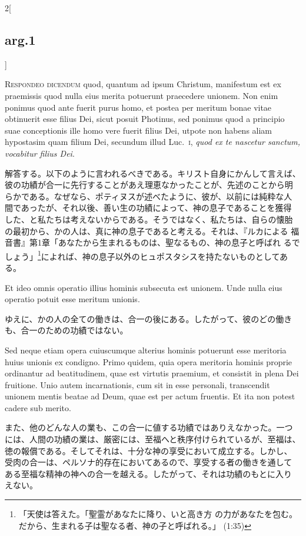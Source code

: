 \documentclass[paper=a4paper,fontsize=10pt,jafontsize=9pt,titlepage]{jlreq}
\begin{document}
\begin{paracol}{2}[\subsection{arg.1}]

{\scshape Respondeo dicendum} quod, quantum ad ipsum Christum,
manifestum est ex praemissis quod nulla eius merita potuerunt
praecedere unionem. Non enim ponimus quod ante fuerit purus homo, et
postea per meritum bonae vitae obtinuerit esse filius Dei, sicut
posuit Photinus, sed ponimus quod a principio suae conceptionis ille
homo vere fuerit filius Dei, utpote non habens aliam hypostasim quam
filium Dei, secundum illud Luc.~{\scshape i}, {\itshape quod ex te
nascetur sanctum, vocabitur filius Dei}.

\switchcolumn

解答する。以下のように言われるべきである。キリスト自身にかんして言えば、
彼の功績が合一に先行することがあえ理恵なかったことが、先述のことから明
らかである。なぜなら、ポティヌスが述べたように、彼が、以前には純粋な人
間であったが、それ以後、善い生の功績によって、神の息子であることを獲得
した、と私たちは考えないからである。そうではなく、私たちは、自らの懐胎
の最初から、かの人は、真に神の息子であると考える。それは、『ルカによる
福音書』第1章「あなたから生まれるものは、聖なるもの、神の息子と呼ばれ
るでしょう」\footnote{「天使は答えた。「聖霊があなたに降り、いと高き方
の力があなたを包む。だから、生まれる子は聖なる者、神の子と呼ばれる。」
(1:35) }によれば、神の息子以外のヒュポスタシスを持たないものとしてある。

\switchcolumn*

Et ideo omnis operatio illius hominis subsecuta est unionem. Unde
nulla eius operatio potuit esse meritum unionis.

\switchcolumn

ゆえに、かの人の全ての働きは、合一の後にある。したがって、彼のどの働き
も、合一のための功績ではない。

\switchcolumn*

Sed neque etiam opera cuiuscumque alterius hominis potuerunt esse
meritoria huius unionis ex condigno.  Primo quidem, quia opera
meritoria hominis proprie ordinantur ad beatitudinem, quae est
virtutis praemium, et consistit in plena Dei fruitione. Unio autem
incarnationis, cum sit in esse personali, transcendit unionem mentis
beatae ad Deum, quae est per actum fruentis. Et ita non potest cadere
sub merito.

\switchcolumn

また、他のどんな人の業も、この合一に値する功績ではありえなかった。一つ
には、人間の功績の業は、厳密には、至福へと秩序付けられているが、至福は、
徳の報償である。そしてそれは、十分な神の享受において成立する。しかし、
受肉の合一は、ペルソナ的存在においてあるので、享受する者の働きを通して
ある至福な精神の神への合一を越える。したがって、それは功績のもとに入り
えない。


\end{paracol}
\end{document}
